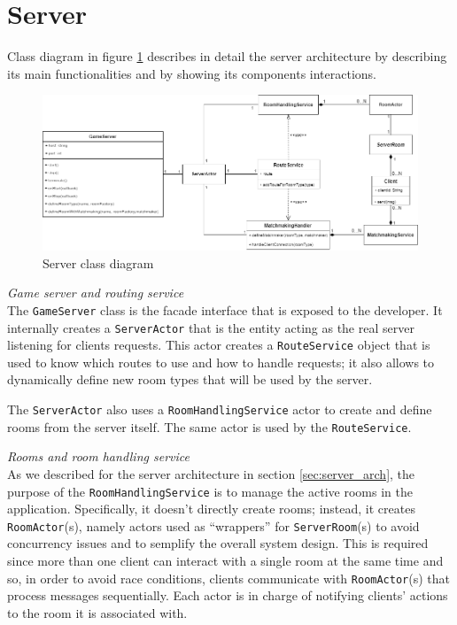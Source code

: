 \section{Server}
Class diagram in figure \ref{fig:server_class_diagram} describes in detail the server architecture by describing its main functionalities and by showing its components interactions. 
\begin{figure}[h]
	\hspace*{-1.1in}
	\includegraphics[scale=0.55]{images/4-design/server_class.png}
	\caption{Server class diagram}
	\label{fig:server_class_diagram}
\end{figure}

\textit{Game server and routing service}
\\
The \texttt{GameServer} class is the facade interface that is exposed to the developer. It internally creates a \texttt{ServerActor} that is the entity acting as the real server listening for clients requests. This actor creates a \texttt{RouteService} object that is used to know which routes to use and how to handle requests; it also allows to dynamically define new room types that will be used by the server. 

The \texttt{ServerActor} also uses a \texttt{RoomHandlingService} actor to create and define rooms from the server itself. The same actor is used by the \texttt{RouteService}.

\bigskip
\textit{Rooms and room handling service}
\\
As we described for the server architecture in section \ref{sec:server_arch}, the purpose of the \texttt{RoomHandlingService} is to manage the active rooms in the application. Specifically, it doesn't directly create rooms; instead, it creates \texttt{RoomActor}(s), namely actors used as ``wrappers'' for \texttt{ServerRoom}(s) to avoid concurrency issues and to semplify the overall system design. This is required since more than one client can interact with a single room at the same time and so, in order to avoid race conditions, clients communicate with \texttt{RoomActor}(s) that process messages sequentially. Each actor is in charge of notifying clients' actions to the room it is associated with.

